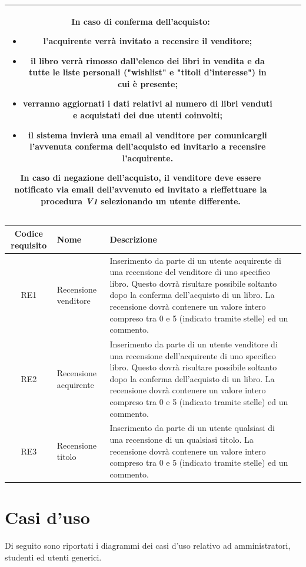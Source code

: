 \documentclass[10pt,a4paper]{report}
\begin{document}
\begin{tabular}{cp{3cm}p{9cm}p{1cm}}
		In caso di conferma dell'acquisto:
		\begin{itemize}
			\item l'acquirente verrà invitato a recensire il venditore;
			\item il libro verrà rimosso dall'elenco dei libri in vendita e da tutte le liste personali ("wishlist" e "titoli d'interesse") in cui è presente;
			\item verranno aggiornati i dati relativi al numero di libri venduti e acquistati dei due utenti coinvolti;
			\item il sistema invierà una email al venditore per comunicargli l'avvenuta conferma dell'acquisto ed invitarlo a recensire l'acquirente.
		\end{itemize}
		In caso di negazione dell'acquisto, il venditore deve essere notificato via email dell'avvenuto ed invitato a rieffettuare la procedura \textit{V1} selezionando un utente differente. \\ \hline
	\end{tabular}

	\begin{tabular}{cp{3cm}p{9cm}p{1cm}}
		Codice requisito&Nome&Descrizione\\ \hline
		RE1&Recensione venditore&Inserimento da parte di un utente acquirente di una recensione del venditore di uno specifico libro. Questo dovrà risultare possibile soltanto dopo la conferma dell'acquisto di un libro. La recensione dovrà contenere un valore intero compreso tra 0 e 5 (indicato tramite stelle) ed un commento.\\ \hline
		RE2&Recensione acquirente&Inserimento da parte di un utente venditore di una recensione dell'acquirente di uno specifico libro. Questo dovrà risultare possibile soltanto dopo la conferma dell'acquisto di un libro. La recensione dovrà contenere un valore intero compreso tra 0 e 5 (indicato tramite stelle) ed un commento.\\ \hline
		RE3&Recensione titolo&Inserimento da parte di un utente qualsiasi di una recensione di un qualsiasi titolo. La recensione dovrà contenere un valore intero compreso tra 0 e 5 (indicato tramite stelle) ed un commento.\\ \hline
	\end{tabular}

	
	\section{Casi d'uso}
	Di seguito sono riportati i diagrammi dei casi d'uso relativo ad amministratori, studenti ed utenti generici.
	
\end{document}
